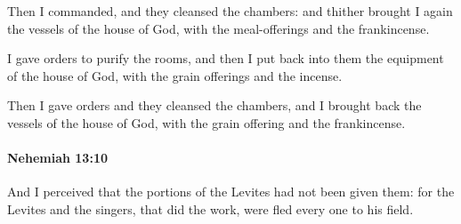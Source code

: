 			\begin{versebox}
					\item[BHS] 
					\item[LXX] 
					\item[ASV] Then I commanded, and they cleansed the chambers: and thither brought I again the vessels of the house of God, with the meal-offerings and the frankincense.
					\item[NIV] I gave orders to purify the rooms, and then I put back into them the equipment of the house of God, with the grain offerings and the incense.
					\item[NRSV] Then I gave orders and they cleansed the chambers, and I brought back the vessels of the house of God, with the grain offering and the frankincense.
			\end{versebox}

		\paragraph{Nehemiah 13:10} %
			\label{NEHEMIAH-13-10}

			And I perceived that the portions of the Levites had not been given them: for the Levites and the singers, that did the work, were fled every one to his field.

